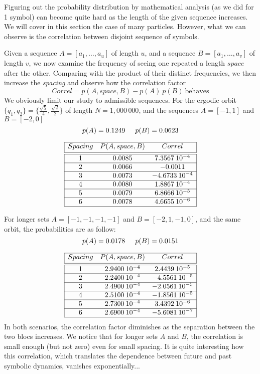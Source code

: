 Figuring out the probability distribution by mathematical analysis (as we
did for 1 symbol) can become quite hard as the length of the given
sequence increases. We will cover in this section the case of many
particles. However, what we can observe is the correlation between
disjoint sequence of symbols.

Given a sequence $A = [a_1, \dots, a_u ]$ of length $u$, and a sequence
$B =  [a_1, \dots, a_v]$ of length $v$, we now examine the frequency of
seeing one repeated a length $space$ after the other. Comparing with the
product of their distinct frequencies, we then increase the
\textit{spacing} and observe how the correlation factor
\[
  Correl = p(A,space,B) - p(A) \: p(B) \: \text{behaves}
  \]
We obviously limit our study to admissible sequences. For the ergodic
orbit $ \{q_1,q_2\} = \{ \frac{\sqrt{5}}{4}, \frac{\sqrt{2}}{2} \} $ of
length $N = 1,000\,000$, and the sequences $A = [-1,1] $ and $B = [-2,0]$
\[
   p(A) = 0.1249 \hskip 0.2in p(B) = 0.0623
\]

   \[
\begin{array}{|c c c|}
\hline
Spacing & P(A,space,B) & Correl \\ [0.5ex]
\hline \hline
1 & 0.0085 & 7.3567\:10^{-4} \\
\hline
2 & 0.0066 & -0.0011\\
\hline
3 & 0.0073 & -4.6733\:10^{-4}\\
\hline
4 & 0.0080 & 1.8867\:10^{-4}\\
\hline
5 & 0.0079 & 6.8666\:10^{-5}\\
\hline
6 & 0.0078 & 4.6655\:10^{-6}\\
\hline
\end{array}
\]

For longer sets $A = [-1,-1,-1,-1]$ and $B = [-2,1,-1,0]$, and the same
orbit, the probabilities are as follow:
\[
   p(A) = 0.0178 \hskip 0.2in p(B) = 0.0151
\]

\[
\begin{array}{|c c c|}
\hline
Spacing & P(A,space,B) & Correl \\ [0.5ex]
\hline \hline
1 & 2.9400\:10^{-4} & 2.4439\:10^{-5}\\
\hline
2 & 2.2400\:10^{-4} & -4.5561\:10^{-5}\\
\hline
3 & 2.4900\:10^{-4} & -2.0561\:10^{-5}\\
\hline
4 & 2.5100\:10^{-4} & -1.8561\:10^{-5}\\
\hline
5 & 2.7300\:10^{-4} & 3.4392\:10^{-6}\\
\hline
6 & 2.6900\:10^{-4} & -5.6081\:10^{-7}\\
\hline
\end{array}
\]
\vskip 0.05in
In both scenarios, the correlation factor diminishes as the separation between the two blocs increases.  We notice that for longer sets $A$ and $B$, the correlation is small enough (but not zero) even for small spacing. It is quite interesting how this correlation, which translates the dependence between future and past symbolic dynamics, vanishes exponentially...

